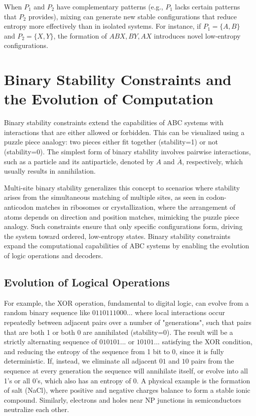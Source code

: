 \documentclass[entropy,article,submit,pdftex,moreauthors]{Definitions/mdpi}
\begin{document}
When \( P_1 \) and \( P_2 \) have complementary patterns (e.g., \( P_1 \) lacks certain patterns that \( P_2 \) provides), mixing can generate new stable configurations that reduce entropy more effectively than in isolated systems. For instance, if \( P_1 = \{A, B\} \) and \( P_2 = \{X, Y\} \), the formation of \( ABX, BY, AX \) introduces novel low-entropy configurations.

\section{Binary Stability Constraints and the Evolution of Computation}

Binary stability constraints extend the capabilities of ABC systems with interactions that are either allowed or forbidden. This can be visualized using a puzzle piece analogy: two pieces either fit together (stability=1) or not (stability=0). The simplest form of binary stability involves pairwise interactions, such as a particle and its antiparticle, denoted by \( A \) and \( \overline{A} \), respectively, which usually results in annihilation. 

Multi-site binary stability generalizes this concept to scenarios where stability arises from the simultaneous matching of multiple sites, as seen in codon-anticodon matches in ribosomes or crystallization, where the arrangement of atoms depends on direction and position matches, mimicking the puzzle piece analogy. Such constraints ensure that only specific configurations form, driving the system toward ordered, low-entropy states. Binary stability constraints expand the computational capabilities of ABC systems by enabling the evolution of logic operations and decoders. 

\subsection{Evolution of Logical Operations}

For example, the XOR operation, fundamental to digital logic, can evolve from a random binary sequence  like \( 0110111000\dots \) where local interactions occur repeatedly between adjacent pairs over a number of "generations", such that pairs that are both 1 or both 0 are annihilated (stability=0). The result will be a strictly alternating sequence of \( 010101... \) or \( 10101... \) satisfying the XOR condition, and reducing the entropy of the sequence from 1 bit to 0, since it is fully deterministic. If, instead, we eliminate all adjacent \( 01 \) and \( 10 \) pairs from the sequence at every generation the sequence will annihilate itself, or evolve into all 1's or all 0's, which also has an entropy of 0. A physical example is the formation of salt (NaCl), where positive and negative charges balance to form a stable ionic compound. Similarly, electrons and holes near NP junctions in semiconductors neutralize each other.
\end{document}
